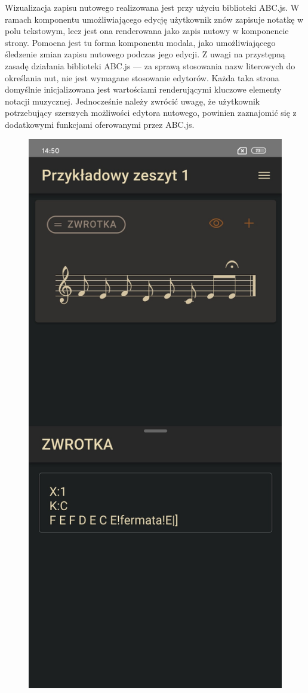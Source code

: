 Wizualizacja zapisu nutowego realizowana jest przy użyciu biblioteki ABC.js. W ramach komponentu umożliwiającego edycję
użytkownik znów zapisuje notatkę w polu tekstowym, lecz jest ona renderowana jako zapis nutowy w komponencie strony. Pomocna jest tu forma komponentu modala,
jako umożliwiającego śledzenie zmian zapisu nutowego podczas jego edycji. Z uwagi na przystępną zasadę działania biblioteki
ABC.js — za sprawą stosowania nazw literowych do określania nut, nie jest wymagane stosowanie edytorów.
Każda taka strona domyślnie inicjalizowana jest wartościami renderującymi kluczowe elementy notacji muzycznej.
Jednocześnie należy zwrócić uwagę, że użytkownik potrzebujący szerszych możliwości edytora nutowego, powinien zaznajomić
się z dodatkowymi funkcjami oferowanymi przez ABC.js.
\begin{figure}[H]
	\begin{center}
		\includegraphics[scale=0.2]{media/ScorePage.jpg}

\end{center}
\end{figure}
